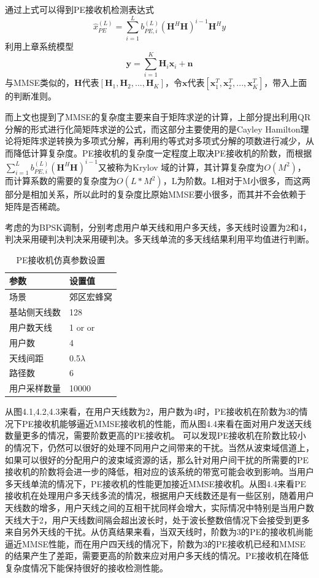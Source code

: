 \documentclass[bachelor,nocolorlinks, printoneside]{seuthesis} %
\begin{document}
\begin{Main}
通过上式可以得到PE接收机检测表达式
\begin{equation}\label{key}
\hat{x}_{PE}^{(L)} = \sum_{i=1}^{L}b_{PE,i}^{(L)}(\mathbf{H}^H\mathbf{H})^{i-1}  \mathbf{H}^H y
\end{equation}
利用上章系统模型
\begin{equation}\label{key}
	\mathbf{y} = \sum_{i=1}^{K} \mathbf{H}_i \mathbf{x}_i + \mathbf{n}
\end{equation}
与MMSE类似的，$\mathbf{H}$代表$[\mathbf{H}_1,\mathbf{H}_2,...,\mathbf{H}_K]$，令$\mathbf{x}$代表$[\mathbf{x}_1^T,\mathbf{x}_2^T,...,\mathbf{x}_K^T]$，带入上面的判断准则。

而上文也提到了MMSE的复杂度主要来自于矩阵求逆的计算，上部分提出利用QR分解的形式进行化简矩阵求逆的公式，而这部分主要使用的是Cayley Hamilton理论将矩阵求逆转换为多项式分解，再利用约等式对多项式分解的项数进行减少，从而降低计算复杂度。PE接收机的复杂度一定程度上取决PE接收机的阶数，而根据$\sum_{i=1}^{L} b_{PE,i}^{(L)}(\mathbf{H}^H\mathbf{H})^{i-1}$又被称为Krylov 域的计算，其计算复杂度为$O(M^2)$，而计算系数的需要的复杂度为$O(L*M^2)$，L为阶数。L相对于M小很多，而这两部分是相加关系，所以此时的复杂度比原始MMSE要小很多，而其并不会依赖于矩阵是否稀疏。

考虑的为BPSK调制，分别考虑用户单天线和用户多天线，多天线时设置为2和4，判决采用硬判决判决采用硬判决。多天线单流的多天线结果利用平均值进行判断。
\begin{table}[htbp]
	\centering
	\caption{\label{tab:test}PE接收机仿真参数设置}
	\begin{tabular}{ll}
		\toprule
		参数 &  设置值 \\
		\bottomrule
		场景 &  郊区宏蜂窝 \\
		\bottomrule
		基站侧天线数 & 128 \\
		\bottomrule
		用户数天线	& 1 \quad or\quad2 or\quad4\\
		\bottomrule
		用户数	& 4 \\
		\bottomrule
		天线间距 & 0.5$\lambda$ \\
		\bottomrule
		路径数 & 6 \\
		\bottomrule
		用户采样数量 & 10000 \\
		\bottomrule
	\end{tabular}
\end{table}


从图4.1,4.2,4.3来看，在用户天线数为2，用户数为4时，PE接收机在阶数为3的情况下PE接收机能够逼近MMSE接收机的性能，而从图4.4来看在面对用户发送天线数量更多的情况，需要阶数更高的PE接收机。
可以发现PE接收机在阶数比较小的情况下，仍然可以很好的处理不同用户之间带来的干扰。当然从波束域信道上，如果可以很好的分配用户的波束域资源的话，那么针对用户间干扰的所需要的PE接收机的阶数将会进一步的降低，相对应的该系统的带宽可能会收到影响。当用户多天线单流的情况下，PE接收机的性能更加接近MMSE接收机。从图4.4来看PE接收机在处理用户多天线多流的情况，根据用户天线数还是有一些区别，随着用户天线数的增多，用户天线之间的互相干扰同样会增大，实际情况中特别是当用户数天线大于2，用户天线数间隔会超出波长时，处于波长整数倍情况下会接受到更多来自另外天线的干扰。从仿真结果来看，当双天线时，阶数为3的PE的接收机尚能逼近MMSE性能，而在用户四天线的情况下，阶数为3的PE接收机已经和MMSE的结果产生了差距，需要更高的阶数来应对用户多天线的情况。PE接收机在降低复杂度情况下能保持很好的接收检测性能。


\end{Main}
\end{document}
